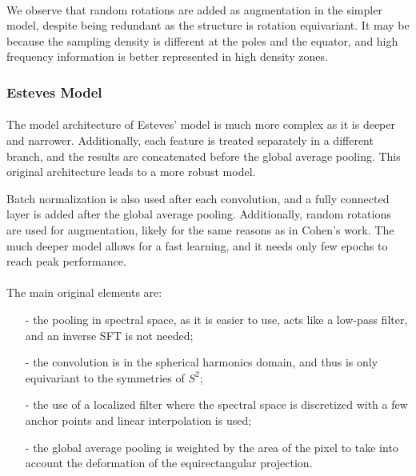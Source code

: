 \documentclass[11pt]{report}
\begin{document}
\paragraph*{}
We observe that random rotations are added as augmentation in the simpler model, despite being redundant as the structure is rotation equivariant. It may be because the sampling density is different at the poles and the equator, and high frequency information is better represented in high density zones.

\subsubsection{Esteves Model}
\paragraph*{}
The model architecture of Esteves' model \cite{esteves_learning_2017} is much more complex as it is deeper and narrower. Additionally, each feature is treated separately in a different branch, and the results are concatenated before the global average pooling. This original architecture leads to a more robust model.

Batch normalization is also used after each convolution, and a fully connected layer is added after the global average pooling. Additionally, random rotations are used for augmentation, likely for the same reasons as in Cohen's work. The much deeper model allows for a fast learning, and it needs only few epochs to reach peak performance.%

\paragraph*{}
The main original elements are:
\begin{itemize}
\setlength\itemsep{0.07em}
    \item[-] the pooling in spectral space, as it is easier to use, acts like a low-pass filter, and an inverse SFT is not needed;
    \item[-] the convolution is in the spherical harmonics domain, and thus is only equivariant to the symmetries of $S^2$;
    \item[-] the use of a localized filter where the spectral space is discretized with a few anchor points and linear interpolation is used;
    \item[-] the global average pooling is weighted by the area of the pixel to take into account the deformation of the equirectangular projection.
\end{itemize}
\end{document}
